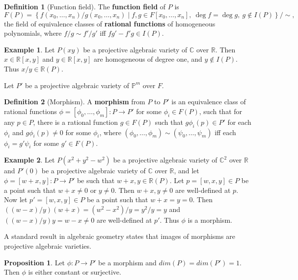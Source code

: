 \documentclass{article}
\newcommand{\R}{\mathbb{R}}
\newcommand{\C}{\mathbb{C}}
\renewcommand{\P}{\mathbb{P}}
\newcommand{\rb}[1]{\left( #1 \right)}
\renewcommand{\sb}[1]{\left[ #1 \right]}
\newcommand{\cb}[1]{\left\{ #1 \right\}}
\theoremstyle{definition}\newtheorem*{definition}{Definition}
\theoremstyle{definition}\newtheorem*{example}{Example}
\theoremstyle{definition}\newtheorem*{remark}{Remark}
\newtheorem{proposition}{Proposition}[subsection]
\begin{document}
\begin{definition}[Function field]
The \textbf{function field} of $ P $ is
$$ F\rb{P} = \cb{f\rb{x_0, \dots, x_n} / g\rb{x_0, \dots, x_n} \mid f, g \in F\sb{x_0, \dots, x_n}, \ \deg f = \deg g, \ g \notin I\rb{P}} / \sim, $$
the field of equivalence classes of \textbf{rational functions} of homogeneous polynomials, where $ f / g \sim f' / g' $ iff $ fg' - f'g \in I\rb{P} $.
\end{definition}

\begin{example}
Let $ P\rb{xy} $ be a projective algebraic variety of $ \C $ over $ \R $. Then $ x \in \R\sb{x, y} $ and $ y \in \R\sb{x, y} $ are homogeneous of degree one, and $ y \notin I\rb{P} $. Thus $ x / y \in \R\rb{P} $.
\end{example}

Let $ P' $ be a projective algebraic variety of $ \P^m $ over $ F $.

\begin{definition}[Morphism]
A \textbf{morphism} from $ P $ to $ P' $ is an equivalence class of rational functions $ \phi = \sb{\phi_0, \dots, \phi_m} : P \to P' $ for some $ \phi_i \in F\rb{P} $, such that for any $ p \in P $, there is a rational function $ g \in F\rb{P} $ such that $ g\phi_i\rb{p} \in P' $ for each $ \phi_i $ and $ g\phi_i\rb{p} \ne 0 $ for some $ \phi_i $, where $ \rb{\phi_0, \dots, \phi_m} \sim \rb{\psi_0, \dots, \psi_m} $ iff each $ \phi_i = g'\psi_i $ for some $ g' \in F\rb{P} $.
\end{definition}

\begin{example}
Let $ P\rb{x^2 + y^2 - w^2} $ be a projective algebraic variety of $ \C^2 $ over $ \R $ and $ P'\rb{0} $ be a projective algebraic variety of $ \C $ over $ \R $, and let $ \phi = \sb{w + x, y} : P \to P' $ be such that $ w + x, y \in \R\rb{P} $. Let $ p = \sb{w, x, y} \in P $ be a point such that $ w + x \ne 0 $ or $ y \ne 0 $. Then $ w + x, y \ne 0 $ are well-defined at $ p $. Now let $ p' = \sb{w, x, y} \in P $ be a point such that $ w + x = y = 0 $. Then $ \rb{\rb{w - x} / y}\rb{w + x} = \rb{w^2 - x^2} / y = y^2 / y = y $ and $ \rb{\rb{w - x} / y}y = w - x \ne 0 $ are well-defined at $ p' $. Thus $ \phi $ is a morphism.
\end{example}

A standard result in algebraic geometry states that images of morphisms are projective algebraic varieties.

\begin{proposition}
Let $ \phi : P \to P' $ be a morphism and $ dim\rb{P} = dim\rb{P'} = 1 $. Then $ \phi $ is either constant or surjective.
\end{proposition}
\end{document}
